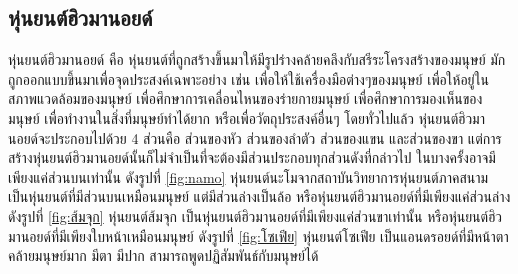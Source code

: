 

\subsection{หุ่นยนต์ฮิวมานอยด์}
หุ่นยนต์ฮิวมานอยด์ คือ หุ่นยนต์ที่ถูกสร้างขึ้นมาให้มีรูปร่างคล้ายคลึงกับสรีระโครงสร้างของมนุษย์
มักถูกออกแบบขึ้นมาเพื่อจุดประสงค์เฉพาะอย่าง เช่น เพื่อให้ใช้เครื่องมือต่างๆของมนุษย์ เพื่อให้อยู่ในสภาพแวดล้อมของมนุษย์
เพื่อศึกษาการเคลื่อนไหนของร่ายกายมนุษย์ เพื่อศึกษาการมองเห็นของมนุษย์ เพื่อทำงานในสิ่งที่มนุษย์ทำได้ยาก
หรือเพื่อวัตถุประสงค์อื่นๆ โดยทั่วไปแล้ว หุ่นยนต์ฮิวมานอยด์จะประกอบไปด้วย 4 ส่วนคือ ส่วนของหัว ส่วนของลำตัว ส่วนของแขน
และส่วนของขา แต่การสร้างหุ่นยนต์ฮิวมานอยด์นั้นก็ไม่จำเป็นที่จะต้องมีส่วนประกอบทุกส่วนดังที่กล่าวไป
ในบางครั้งอาจมีเพียงแค่ส่วนบนเท่านั้น ดังรูปที่ \ref{fig:namo} หุ่นยนต์นะโมจากสถาบันวิทยาการหุ่นยนต์ภาคสนาม
เป็นหุ่นยนต์ที่มีส่วนบนเหมือนมนุษย์ แต่มีส่วนล่างเป็นล้อ หรือหุ่นยนต์ฮิวมานอยด์ที่มีเพียงแค่ส่วนล่าง ดังรูปที่ \ref{fig:ส้มจุก}
หุ่นยนต์ส้มจุก เป็นหุ่นยนต์ฮิวมานอยด์ที่มีเพียงแค่ส่วนขาเท่านั้น หรือหุ่นยนต์ฮิวมานอยด์ที่มีเพียงใบหน้าเหมือนมนุษย์ ดังรูปที่
\ref{fig:โซเฟีย} หุ่นยนต์โซเฟีย เป็นแอนดรอยด์ที่มีหน้าตาคล้ายมนุษย์มาก มีตา มีปาก สามารถพูดปฏิสัมพันธ์กับมนุษย์ได้

